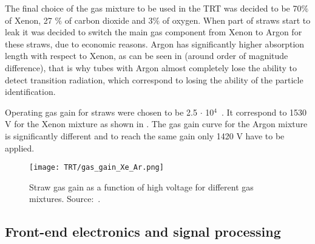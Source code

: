 The final choice of the gas mixture to be used in the TRT was decided to be 70$\%$ of Xenon, 27 $\%$ of carbon dioxide and 3$\%$ of oxygen.
When part of straws start to leak it was decided to switch the main gas component from Xenon to Argon for these straws, due to economic reasons.
Argon has significantly higher absorption length with respect to Xenon, as can be seen in  (around order of magnitude difference), 
that is why tubes with Argon almost completely lose the ability to detect transition radiation, 
which correspond to losing the ability of the particle identification.

Operating gas gain for straws were chosen to be 2.5 $\cdot$ 10$^4$~\cite{ID_TDR_vol1}. It correspond to 1530 V for the Xenon mixture as shown in .
The gas gain curve for the Argon mixture is significantly different and to reach the same gain only 1420 V have to be applied.

\begin{figure}
\centering
\texttt{[image: TRT/gas\_gain\_Xe\_Ar.png]}
\caption{ 
Straw gas gain as a function of high voltage for different gas mixtures. Source:~\cite{Abat:2008zza}.
}
\label{fig:gas_gain}
\end{figure}



\subsection{Front-end electronics and signal processing}
\label{subsubsec:front_end_electronics}


